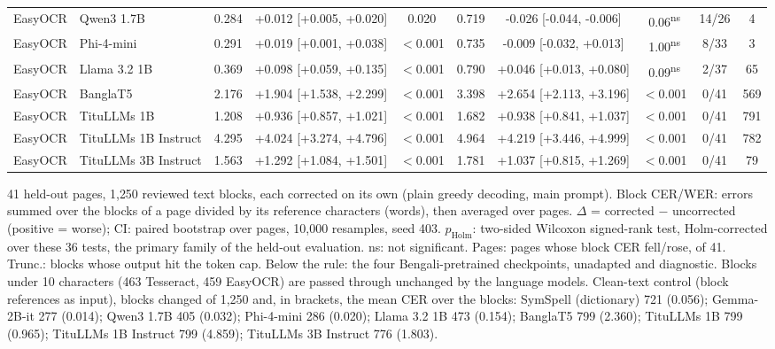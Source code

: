 \begin{table}[t]
\begin{tabular}{llcccccccc}
EasyOCR & Qwen3 1.7B & 0.284 & +0.012 [+0.005, +0.020] & 0.020 & 0.719 & -0.026 [-0.044, -0.006] & 0.06\textsuperscript{ns} & 14/26 & 4 \\
EasyOCR & Phi-4-mini & 0.291 & +0.019 [+0.001, +0.038] & $<$0.001 & 0.735 & -0.009 [-0.032, +0.013] & 1.00\textsuperscript{ns} & 8/33 & 3 \\
EasyOCR & Llama 3.2 1B & 0.369 & +0.098 [+0.059, +0.135] & $<$0.001 & 0.790 & +0.046 [+0.013, +0.080] & 0.09\textsuperscript{ns} & 2/37 & 65 \\
\cmidrule(lr){2-10}
EasyOCR & BanglaT5 & 2.176 & +1.904 [+1.538, +2.299] & $<$0.001 & 3.398 & +2.654 [+2.113, +3.196] & $<$0.001 & 0/41 & 569 \\
EasyOCR & TituLLMs 1B & 1.208 & +0.936 [+0.857, +1.021] & $<$0.001 & 1.682 & +0.938 [+0.841, +1.037] & $<$0.001 & 0/41 & 791 \\
EasyOCR & TituLLMs 1B Instruct & 4.295 & +4.024 [+3.274, +4.796] & $<$0.001 & 4.964 & +4.219 [+3.446, +4.999] & $<$0.001 & 0/41 & 782 \\
EasyOCR & TituLLMs 3B Instruct & 1.563 & +1.292 [+1.084, +1.501] & $<$0.001 & 1.781 & +1.037 [+0.815, +1.269] & $<$0.001 & 0/41 & 79 \\
\bottomrule
\end{tabular}
\par\smallskip
\begin{minipage}{\linewidth}\footnotesize 41 held-out pages, 1{,}250 reviewed text blocks, each corrected on its own (plain greedy decoding, main prompt). Block CER/WER: errors summed over the blocks of a page divided by its reference characters (words), then averaged over pages. $\Delta$ = corrected $-$ uncorrected (positive = worse); CI: paired bootstrap over pages, 10{,}000 resamples, seed 403. $p_{\mathrm{Holm}}$: two-sided Wilcoxon signed-rank test, Holm-corrected over these 36 tests, the primary family of the held-out evaluation. ns: not significant. Pages: pages whose block CER fell/rose, of 41. Trunc.: blocks whose output hit the token cap. Below the rule: the four Bengali-pretrained checkpoints, unadapted and diagnostic. Blocks under 10 characters (463 Tesseract, 459 EasyOCR) are passed through unchanged by the language models. Clean-text control (block references as input), blocks changed of 1{,}250 and, in brackets, the mean CER over the blocks: SymSpell (dictionary) 721 (0.056); Gemma-2B-it 277 (0.014); Qwen3 1.7B 405 (0.032); Phi-4-mini 286 (0.020); Llama 3.2 1B 473 (0.154); BanglaT5 799 (2.360); TituLLMs 1B 799 (0.965); TituLLMs 1B Instruct 799 (4.859); TituLLMs 3B Instruct 776 (1.803).\end{minipage}
\end{table}
